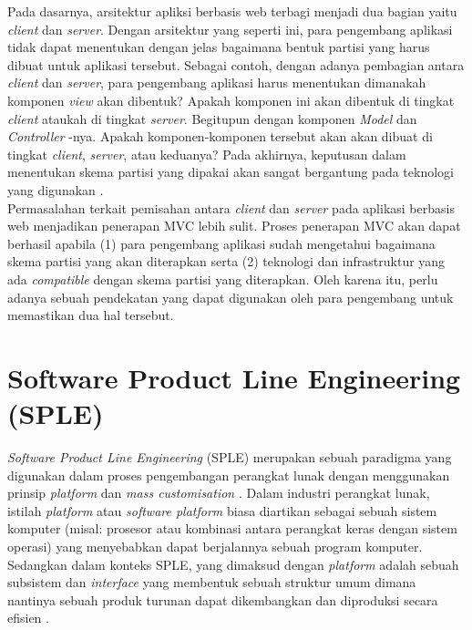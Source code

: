 \noindent
Pada dasarnya, arsitektur apliksi berbasis web terbagi menjadi dua bagian yaitu \textit{client} dan \textit{server}. Dengan arsitektur yang seperti ini, para pengembang aplikasi tidak dapat menentukan dengan jelas bagaimana bentuk partisi yang harus dibuat untuk aplikasi tersebut. Sebagai contoh, dengan adanya pembagian antara \textit{client} dan \textit{server}, para pengembang aplikasi harus menentukan dimanakah komponen \textit{view} akan dibentuk? Apakah komponen ini akan dibentuk di tingkat \textit{client} ataukah di tingkat \textit{server}. Begitupun dengan komponen \textit{Model} dan \textit{Controller
}-nya. Apakah komponen-komponen tersebut akan akan dibuat di tingkat \textit{client}, \textit{server}, atau keduanya? Pada akhirnya, keputusan dalam menentukan skema partisi yang dipakai akan sangat bergantung pada teknologi yang digunakan \citep{leff2001web}. \\

\noindent
Permasalahan terkait pemisahan antara \textit{client} dan \textit{server} pada aplikasi berbasis web menjadikan penerapan MVC lebih sulit. Proses penerapan MVC akan dapat berhasil apabila (1) para pengembang aplikasi sudah mengetahui bagaimana skema partisi yang akan diterapkan serta (2) teknologi dan infrastruktur yang ada \textit{compatible} dengan skema partisi yang diterapkan. Oleh karena itu, perlu adanya sebuah pendekatan yang dapat digunakan oleh para pengembang untuk memastikan dua hal tersebut.

\section{Software Product Line Engineering (SPLE)}
\noindent
\textit{Software Product Line Engineering} (SPLE) merupakan sebuah paradigma yang digunakan dalam proses pengembangan perangkat lunak dengan menggunakan prinsip \textit{platform} dan \textit{mass customisation} \citep[p.~14]{pohl2005software}. Dalam industri perangkat lunak, istilah \textit{platform} atau \textit{software platform} biasa diartikan sebagai sebuah sistem komputer (misal: prosesor atau kombinasi antara perangkat keras dengan sistem operasi) yang menyebabkan dapat berjalannya sebuah program komputer. Sedangkan dalam konteks SPLE, yang dimaksud dengan \textit{platform} adalah sebuah subsistem dan \textit{interface} yang membentuk sebuah struktur umum dimana nantinya sebuah produk turunan dapat dikembangkan dan diproduksi secara efisien \citep[p.~15]{pohl2005software}. \\

